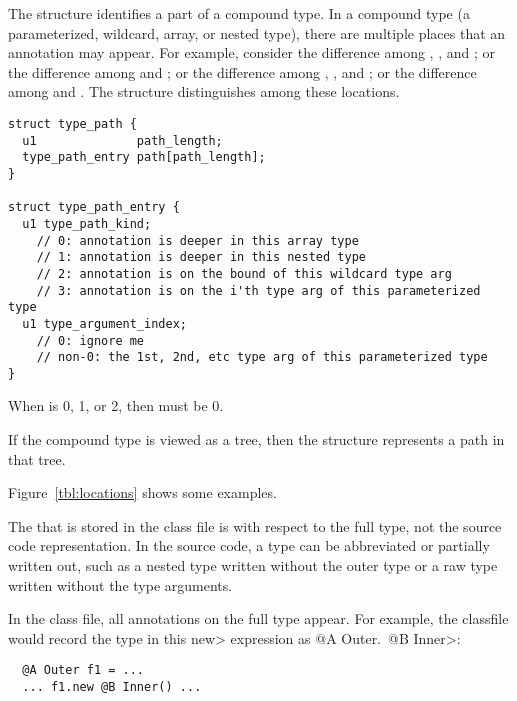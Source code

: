 \documentclass[10pt]{article}
\begin{document}
The  structure identifies a part of a compound type.
In a compound type (a parameterized, wildcard, array, or nested type),
there are multiple places that an annotation may appear.
For example, consider the difference among
,
, and
;
or the difference among
 and
;
or the difference among 
,
, and
;
or the difference among 
 and
.
The  structure distinguishes among these locations.

\begin{Verbatim}
struct type_path {
  u1              path_length;
  type_path_entry path[path_length];
}

struct type_path_entry {
  u1 type_path_kind;
    // 0: annotation is deeper in this array type
    // 1: annotation is deeper in this nested type
    // 2: annotation is on the bound of this wildcard type arg
    // 3: annotation is on the i'th type arg of this parameterized type
  u1 type_argument_index;
    // 0: ignore me
    // non-0: the 1st, 2nd, etc type arg of this parameterized type
}
\end{Verbatim}


When  is 0, 1, or 2, then
 must be 0.

If the compound type is viewed as a tree, then 
the  structure represents a path in that tree.

Figure~\ref{tbl:locations} shows some examples.

The  that is stored in the class file is with respect to the full type, not the
source code representation.  In the source code, a type can be abbreviated
or partially written out, such as a nested type written without the outer
type or a raw type written without the type arguments.

In the class file, all annotations on the full type appear.  For example,
the classfile would record the type in this \<new> expression as
\<@A Outer.\ @B Inner>:

\preverbnegspace
\begin{Verbatim}
  @A Outer f1 = ...
  ... f1.new @B Inner() ...
\end{Verbatim}
\end{document}
